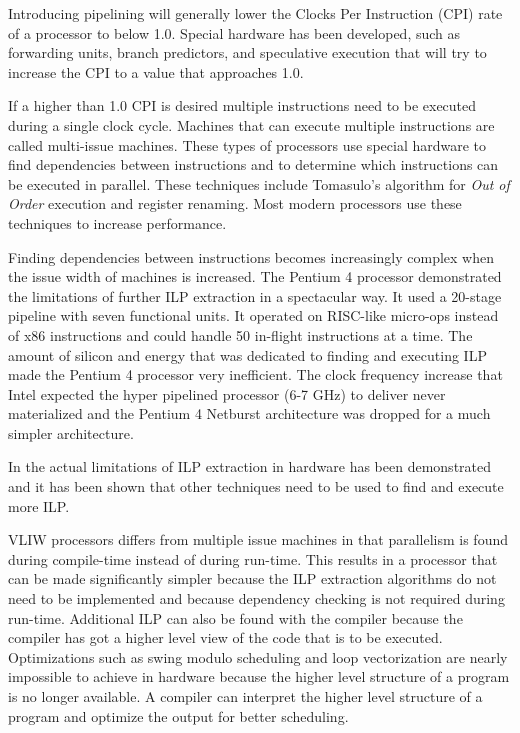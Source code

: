 Introducing pipelining will generally lower the Clocks Per Instruction (CPI) rate of a processor to below 1.0. Special hardware has been developed, such as forwarding units, branch predictors, and speculative execution that will try to increase the CPI to a value that approaches 1.0. 

If a higher than 1.0 CPI is desired multiple instructions need to be executed during a single clock cycle. Machines that can execute multiple instructions are called multi-issue machines. These types of processors use special hardware to find dependencies between instructions and to determine which instructions can be executed in parallel. These techniques include Tomasulo's algorithm for \emph{Out of Order} execution and register renaming. Most modern processors use these techniques to increase performance.

Finding dependencies between instructions becomes increasingly complex when the issue width of machines is increased. The Pentium 4 processor demonstrated the limitations of further ILP extraction in a spectacular way. It used a 20-stage pipeline \cite{John-L.-Hennessy:2012bs} with seven functional units. It operated on RISC-like micro-ops instead of x86 instructions and could handle 50 in-flight instructions at a time. The amount of silicon and energy that was dedicated to finding and executing ILP made the Pentium 4 processor very inefficient. The clock frequency increase that Intel expected the hyper pipelined processor (6-7 GHz) to deliver never materialized and the Pentium 4 Netburst architecture was dropped for a much simpler architecture.

In \cite{Wall:1993xy} the actual limitations of ILP extraction in hardware has been demonstrated and it has been shown that other techniques need to be used to find and execute more ILP.

VLIW processors differs from multiple issue machines in that parallelism is found during compile-time instead of during run-time. This results in a processor that can be made significantly simpler because the ILP extraction algorithms do not need to be implemented and because dependency checking is not required during run-time. Additional ILP can also be found with the compiler because the compiler has got a higher level view of the code that is to be executed. Optimizations such as swing modulo scheduling and loop vectorization are nearly impossible to achieve in hardware because the higher level structure of a program is no longer available. A compiler can interpret the higher level structure of a program and optimize the output for better scheduling.

